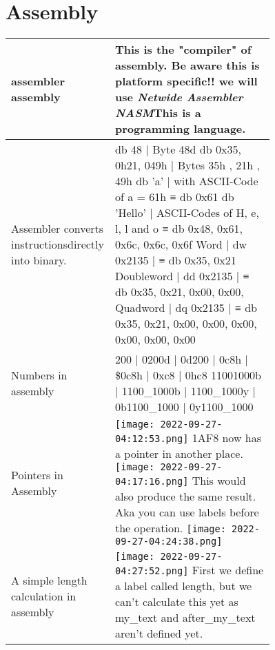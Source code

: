 \documentclass[main.tex,fontsize=8pt,paper=a4,paper=portrait,DIV=calc,]{scrartcl}
\begin{document}
\begin{table}[h!]
\section{Assembly}
\begin{tabular}{|m{0,2\linewidth}|m{0.755\linewidth}|}
\hline
assembler \newline 
assembly & This is the "compiler" of assembly. Be aware this is \textbf{platform specific!!} we will use \emph{Netwide Assembler NASM}\newline This is a programming language.\\
\hline
Assembler converts instructions\newline directly into binary. & db 48 | Byte 48d \newline
db 0x35, 0h21, 049h | Bytes 35h , 21h , 49h \newline
db ’a’ | with ASCII-Code of a = 61h ≡ db 0x61 \newline
db ’Hello’ | ASCII-Codes of H, e, l, l and o ≡ db 0x48, 0x61, 0x6c, 0x6c, 0x6f\newline
Word       | dw 0x2135 | ≡ db 0x35, 0x21\newline
Doubleword | dd 0x2135 | ≡ db 0x35, 0x21, 0x00, 0x00, \newline 
Quadword   | dq 0x2135 | ≡ db 0x35, 0x21, 0x00, 0x00, 0x00, 0x00, 0x00, 0x00 \\  
\hline
Numbers in assembly & 200 | 0200d | 0d200 | 0c8h | \$0c8h | 0xc8 | 0hc8 \newline
11001000b | 1100_1000b | 1100_1000y | 0b1100_1000 | 0y1100_1000
\\
\hline
Pointers in Assembly & \vspace{2mm}\texttt{[image: 2022-09-27-04:12:53.png]} \newline
1AF8 now has a pointer in another place. \newline
\texttt{[image: 2022-09-27-04:17:16.png]}\newline
This would also produce the same result. Aka you can use labels before the operation.\newline
\texttt{[image: 2022-09-27-04:24:38.png]}\\
\hline
A simple length calculation in assembly & \vspace{2mm} \texttt{[image: 2022-09-27-04:27:52.png]}\newline 
First we define a label called length, but we can't calculate this yet as my\_text and after\_my\_text aren't defined yet.\newline

\end{tabular}
\end{table}
\end{document}
